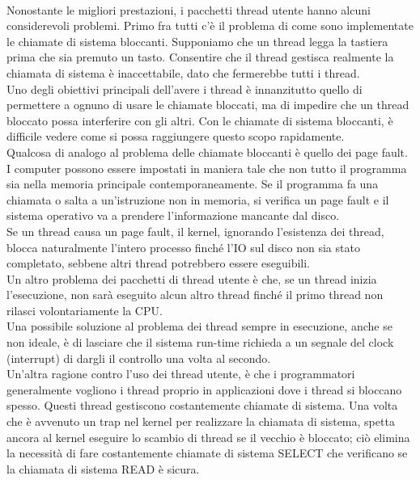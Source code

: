 \documentclass{article}
\begin{document}
\\Nonostante le migliori prestazioni, i pacchetti thread utente hanno alcuni considerevoli problemi. Primo fra tutti c’è il problema di come sono implementate le chiamate di sistema bloccanti. Supponiamo che un thread legga la tastiera prima che sia premuto un tasto. Consentire che il thread gestisca realmente la chiamata di sistema è inaccettabile, dato che fermerebbe tutti i thread.
\\Uno degli obiettivi principali dell’avere i thread è innanzitutto quello di permettere a ognuno di usare le chiamate bloccati, ma di impedire che un thread bloccato possa interferire con gli altri. Con le chiamate di sistema bloccanti, è difficile vedere come si possa raggiungere questo scopo rapidamente.
\\Qualcosa di analogo al problema delle chiamate bloccanti è quello dei page fault.
\\I computer possono essere impostati in maniera tale che non tutto il programma sia nella memoria principale contemporaneamente. Se il programma fa una chiamata o salta a un’istruzione non in memoria, si verifica un page fault e il sistema operativo va a prendere l’informazione mancante dal disco.
\\Se un thread causa un page fault, il kernel, ignorando l’esistenza dei thread, blocca naturalmente l’intero processo finché l’IO sul disco non sia stato completato, sebbene altri thread potrebbero essere eseguibili.
\\Un altro problema dei pacchetti di thread utente è che, se un thread inizia l’esecuzione, non sarà eseguito alcun altro thread finché il primo thread non rilasci volontariamente la CPU.
\\Una possibile soluzione al problema dei thread sempre in esecuzione, anche se non ideale, è di lasciare che il sistema run-time richieda a un segnale del clock (interrupt) di dargli il controllo una volta al secondo.
\\Un’altra ragione contro l’uso dei thread utente, è che i programmatori generalmente vogliono i thread proprio in applicazioni dove i thread si bloccano spesso. Questi thread gestiscono costantemente chiamate di sistema. Una volta che è avvenuto un trap nel kernel per realizzare la chiamata di sistema, spetta ancora al kernel eseguire lo scambio di thread se il vecchio è bloccato; ciò elimina la necessità di fare costantemente chiamate di sistema SELECT che verificano se la chiamata di sistema READ è sicura. 
\end{document}
